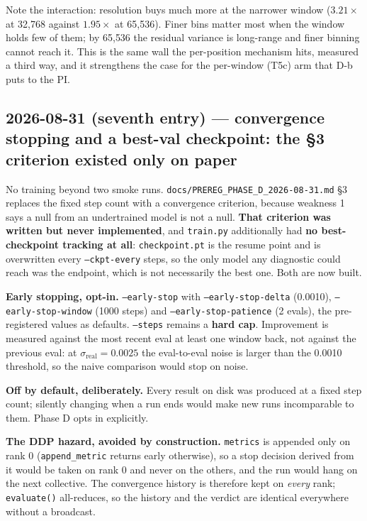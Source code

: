 \documentclass[11pt,a4paper]{article}
\newcommand{\code}[1]{\texttt{\small #1}}
\begin{document}
Note the interaction: resolution buys much more at the narrower window
($3.21\times$ at 32{,}768 against $1.95\times$ at 65{,}536). Finer bins matter
most when the window holds few of them; by 65{,}536 the residual variance is
long-range and finer binning cannot reach it. This is the same wall the
per-position mechanism hits, measured a third way, and it strengthens the case
for the per-window (T5c) arm that D-b puts to the PI.


\subsection*{2026-08-31 (seventh entry) --- convergence stopping and a
best-val checkpoint: the \S3 criterion existed only on paper}

No training beyond two smoke runs. \code{docs/PREREG\_PHASE\_D\_2026-08-31.md}
\S3 replaces the fixed step count with a convergence criterion, because
weakness 1 says a null from an undertrained model is not a null.
\textbf{That criterion was written but never implemented}, and
\code{train.py} additionally had \textbf{no best-checkpoint tracking at all}:
\code{checkpoint.pt} is the resume point and is overwritten every
\code{--ckpt-every} steps, so the only model any diagnostic could reach was
the endpoint, which is not necessarily the best one. Both are now built.

\textbf{Early stopping, opt-in.} \code{--early-stop} with
\code{--early-stop-delta} (0.0010), \code{--early-stop-window} (1000 steps)
and \code{--early-stop-patience} (2 evals), the pre-registered values as
defaults. \code{--steps} remains a \textbf{hard cap}. Improvement is measured
against the most recent eval at least one window back, not against the
previous eval: at $\sigma_{\text{real}} = 0.0025$ the eval-to-eval noise is
larger than the 0.0010 threshold, so the naive comparison would stop on noise.

\textbf{Off by default, deliberately.} Every result on disk was produced at a
fixed step count; silently changing when a run ends would make new runs
incomparable to them. Phase D opts in explicitly.

\textbf{The DDP hazard, avoided by construction.} \code{metrics} is appended
only on rank 0 (\code{append\_metric} returns early otherwise), so a stop
decision derived from it would be taken on rank 0 and never on the others, and
the run would hang on the next collective. The convergence history is
therefore kept on \emph{every} rank; \code{evaluate()} all-reduces, so the
history and the verdict are identical everywhere without a broadcast.
\end{document}
